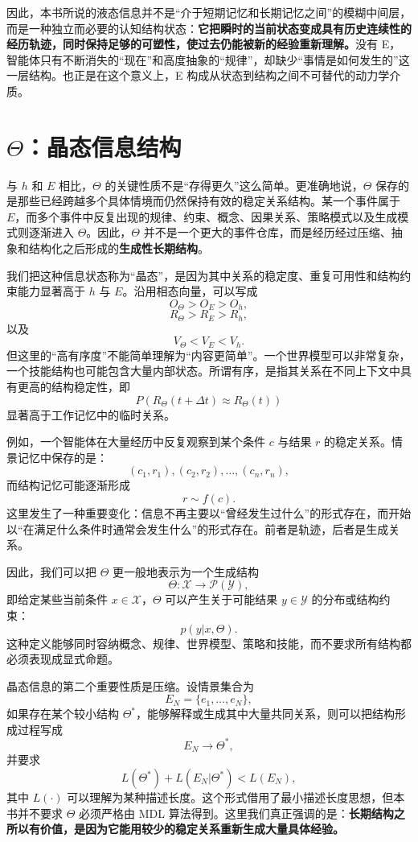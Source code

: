 因此，本书所说的液态信息并不是“介于短期记忆和长期记忆之间”的模糊中间层，而是一种独立而必要的认知结构状态：\textbf{它把瞬时的当前状态变成具有历史连续性的经历轨迹，同时保持足够的可塑性，使过去仍能被新的经验重新理解。}没有 E，智能体只有不断消失的“现在”和高度抽象的“规律”，却缺少“事情是如何发生的”这一层结构。也正是在这个意义上，E 构成从状态到结构之间不可替代的动力学介质。


\section{$\Theta$：晶态信息结构}

与 $h$ 和 $E$ 相比，$\Theta$ 的关键性质不是“存得更久”这么简单。更准确地说，$\Theta$ 保存的是那些已经跨越多个具体情境而仍然保持有效的稳定关系结构。某一个事件属于 $E$，而多个事件中反复出现的规律、约束、概念、因果关系、策略模式以及生成模式则逐渐进入 $\Theta$。因此，$\Theta$ 并不是一个更大的事件仓库，而是经历经过压缩、抽象和结构化之后形成的\textbf{生成性长期结构}。

我们把这种信息状态称为“晶态”，是因为其中关系的稳定度、重复可用性和结构约束能力显著高于 $h$ 与 $E$。沿用相态向量，可以写成
\[
O_\Theta
>
O_E
>
O_h,
\]
\[
R_\Theta
>
R_E
>
R_h,
\]
以及
\[
V_\Theta
<
V_E
<
V_h.
\]
但这里的“高有序度”不能简单理解为“内容更简单”。一个世界模型可以非常复杂，一个技能结构也可能包含大量内部状态。所谓有序，是指其关系在不同上下文中具有更高的结构稳定性，即
\[
P
\left(
R_\Theta(t+\Delta t)
\approx
R_\Theta(t)
\right)
\]
显著高于工作记忆中的临时关系。

例如，一个智能体在大量经历中反复观察到某个条件 $c$ 与结果 $r$ 的稳定关系。情景记忆中保存的是：
\[
(c_1,r_1),(c_2,r_2),\ldots,(c_n,r_n),
\]
而结构记忆可能逐渐形成
\[
r\sim f(c).
\]
这里发生了一种重要变化：信息不再主要以“曾经发生过什么”的形式存在，而开始以“在满足什么条件时通常会发生什么”的形式存在。前者是轨迹，后者是生成关系。

因此，我们可以把 $\Theta$ 更一般地表示为一个生成结构
\[
\Theta:
\mathcal X
\rightarrow
\mathcal P(\mathcal Y),
\]
即给定某些当前条件 $x\in\mathcal X$，$\Theta$ 可以产生关于可能结果 $y\in\mathcal Y$ 的分布或结构约束：
\[
p(y|x,\Theta).
\]
这种定义能够同时容纳概念、规律、世界模型、策略和技能，而不要求所有结构都必须表现成显式命题。

晶态信息的第二个重要性质是压缩。设情景集合为
\[
E_N=\{e_1,\ldots,e_N\},
\]
如果存在某个较小结构 $\Theta^\ast$，能够解释或生成其中大量共同关系，则可以把结构形成过程写成
\[
E_N
\rightarrow
\Theta^\ast,
\]
并要求
\[
L(\Theta^\ast)
+
L(E_N|\Theta^\ast)
<
L(E_N),
\]
其中 $L(\cdot)$ 可以理解为某种描述长度。这个形式借用了最小描述长度思想，但本书并不要求 $\Theta$ 必须严格由 MDL 算法得到。这里我们真正强调的是：\textbf{长期结构之所以有价值，是因为它能用较少的稳定关系重新生成大量具体经验。}

